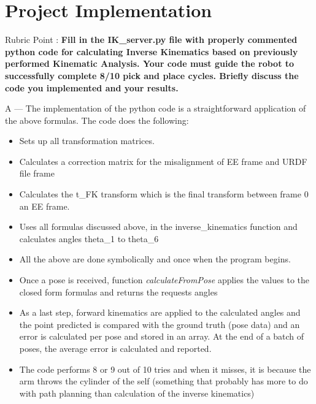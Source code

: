 \documentclass[a4paper,11pt]{article}
\newcounter{question}
\newcommand\Que[1]{%
	   \leavevmode\par
	   \stepcounter{question}
	   \noindent
	   Rubric Point \thequestion :  {\bf #1}\par}
\newcommand\Ans[2][]{%
    \leavevmode\par\noindent
   {\leftskip37pt
    A --- \textbf{#1}#2\par}}
\begin{document}
\section{Project Implementation}
\Que{ Fill in the IK\_server.py file with properly commented python code for calculating Inverse Kinematics based on previously performed Kinematic Analysis. Your code must guide the robot to successfully complete 8/10 pick and place cycles. Briefly discuss the code you implemented and your results.}
\Ans{The implementation of the python code is a straightforward application of the above formulas. The code does the following:
\begin{itemize}
	\item Sets up all transformation matrices.
	\item Calculates a correction matrix for the misalignment of EE frame and URDF file frame
	\item Calculates the t\_FK transform which is the final transform between frame 0 an EE frame.
	\item Uses all formulas discussed above, in the inverse\_kinematics function and calculates angles theta\_1 to theta\_6 
	\item All the above are done symbolically and once when the program begins.
	\item Once a pose is received, function {\em calculateFromPose} applies the values to the closed form formulas and returns the requests angles
	\item As a last step, forward kinematics are applied to the calculated angles and the point predicted is compared with the ground truth (pose data) and an error is calculated per pose and stored in an array. At the end of a batch of poses, the average error is calculated and reported.
	\item The code performs 8 or 9 out of 10 tries and when it misses, it is because the arm throws the cylinder of the self (something that probably has more to do with path planning than calculation of the inverse kinematics)
	
\end{itemize}
}
\end{document}
